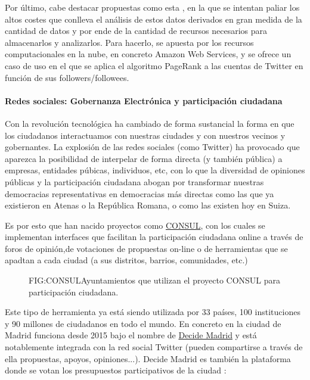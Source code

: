 Por último, cabe destacar propuestas como esta \cite{Noordhuis2010}, en la que se intentan paliar los altos costes que conlleva el análisis de estos datos derivados en gran medida de la cantidad de datos y por ende de la cantidad de recursos necesarios para almacenarlos y analizarlos. Para hacerlo, se apuesta por los recursos computacionales en la nube, en concreto Amazon Web Services, y se ofrece un caso de uso en el que se aplica el algoritmo PageRank a las cuentas de Twitter en función de sus followers/followees.

\paragraph{Redes sociales: Gobernanza Electrónica y participación ciudadana}
Con la revolución tecnológica ha cambiado de forma sustancial la forma en que los ciudadanos interactuamos con nuestras ciudades y con nuestros vecinos y gobernantes. La explosión de las redes sociales (como Twitter) ha provocado que aparezca la posibilidad de interpelar de forma directa (y también pública) a empresas, entidades púbicas, individuos, etc, con lo que la diversidad de opiniones públicas y la participación ciudadana abogan por transformar nuestras democracias representativas en democracias más directas como las que ya existieron en Atenas o la República Romana, o como las existen hoy en Suiza.\cite{Zimmerman1988}\cite{Macintosh2004}

Es por esto que han nacido proyectos como \href{http://consulproject.org/en/}{CONSUL}, con los cuales se implementan interfaces que facilitan la participación ciudadana online a través de foros de opinión,de votaciones de propuestas on-line o de herramientas que se apadtan a cada ciudad (a sus distritos, barrios, comunidades, etc.) 

\begin{figure}[CONSUL en España y el mundo]{FIG:CONSUL}{Ayuntamientos que utilizan el proyecto CONSUL para participación ciudadana.}
	 \quad
\end{figure}
\newpage
Este tipo de herramienta ya está siendo utilizada por 33 países, 100 instituciones y 90 millones de ciudadanos en todo el mundo. En concreto en la ciudad de Madrid funciona desde 2015 bajo el nombre de \href{https://decide.madrid.es/}{Decide Madrid} y está notablemente integrada con la red social Twitter (pueden compartirse  a través de ella propuestas, apoyos, opiniones...). Decide Madrid es también la plataforma donde se votan los presupuestos participativos de la ciudad \cite{Sousa1998}:

